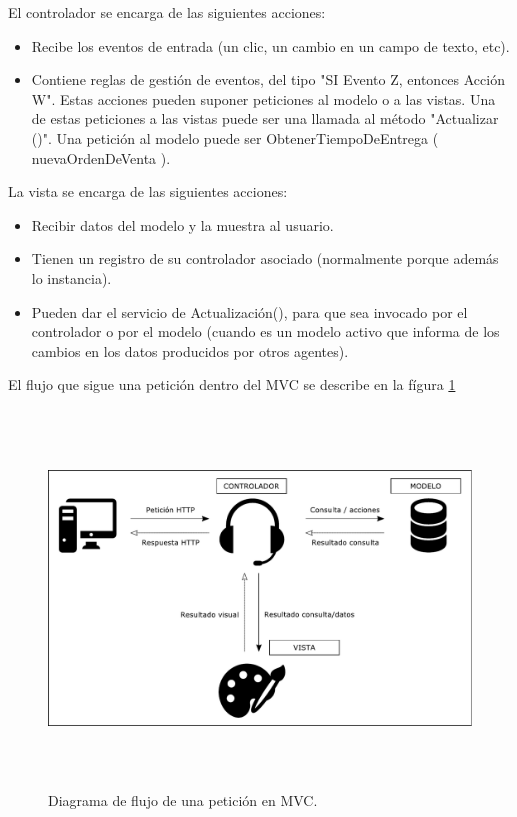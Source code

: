 			El controlador se encarga de las siguientes acciones:

			\begin{itemize}
				\item Recibe los eventos de entrada (un clic, un cambio en un campo de texto, etc). 
				\item Contiene reglas de gesti\'on de eventos, del tipo "SI Evento Z, entonces Acci\'on W". Estas acciones pueden suponer peticiones al modelo o a las vistas. Una de estas peticiones a las vistas puede ser una llamada al m\'etodo "Actualizar ()". Una petici\'on al modelo puede ser ObtenerTiempoDeEntrega ( nuevaOrdenDeVenta ).
			\end{itemize}

			La vista se encarga de las siguientes acciones:

			\begin{itemize}
				\item Recibir datos del modelo y la muestra al usuario. 
				\item Tienen un registro de su controlador asociado (normalmente porque adem\'as lo instancia).
				\item Pueden dar el servicio de Actualizaci\'on(), para que sea invocado por el controlador o por el modelo (cuando es un modelo activo que informa de los cambios en los datos producidos por otros agentes).
			\end{itemize}

			El flujo que sigue una petici\'on dentro del MVC se describe en la f\'igura \ref{fig_MVC}

			\begin{figure}[H]
		        \centering
		        \includegraphics[width=16cm, height=10cm]{figuras/MVC}
		        \caption{Diagrama de flujo de una petici\'on en MVC.}
		        \label{fig_MVC}
		    \end{figure}

